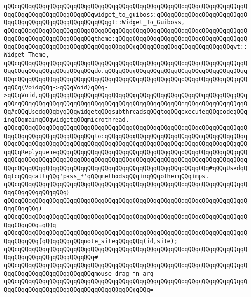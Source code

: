 \verb|qQQqqQQqqQQqqQQqqQQqqQQqqQQqqQQqqQQqqQQqqQQqqQQqqQQqqQQqqQQqqQQqqQQqqQQqqQQqqQQqqQQqqQQqqQQqqQQqwidget_to_guiboss:qQQqqQQqqQQqqQQqqQQqqQQqqQQqqQQqqQQqqQQqqQQqqQQqqQQqqQQqgt::Widget_To_Guiboss,|\newline
\verb|qQQqqQQqqQQqqQQqqQQqqQQqqQQqqQQqqQQqqQQqqQQqqQQqqQQqqQQqqQQqqQQqqQQqqQQqqQQqqQQqqQQqqQQqqQQqqQQqtheme:qQQqqQQqqQQqqQQqqQQqqQQqqQQqqQQqqQQqqQQqqQQqqQQqqQQqqQQqqQQqqQQqqQQqqQQqqQQqqQQqqQQqqQQqqQQqqQQqqQQqqQQqwt::Widget_Theme,|\newline
\verb|qQQqqQQqqQQqqQQqqQQqqQQqqQQqqQQqqQQqqQQqqQQqqQQqqQQqqQQqqQQqqQQqqQQqqQQqqQQqqQQqqQQqqQQqqQQqqQQqdo:qQQqqQQqqQQqqQQqqQQqqQQqqQQqqQQqqQQqqQQqqQQqqQQqqQQqqQQqqQQqqQQqqQQqqQQqqQQqqQQqqQQqqQQqqQQqqQQqqQQqqQQqqQQqqQQqqQQq(VoidqQQq->qQQqVoid)qQQq->qQQqVoid,qQQqqQQqqQQqqQQqqQQqqQQqqQQqqQQqqQQqqQQqqQQqqQQqqQQqqQQqqQQqqQQqqQQqqQQqqQQqqQQqqQQqqQQqqQQqqQQqqQQqqQQqqQQqqQQqqQQqqQQqqQQqqQQqqQQq#qQQqUsedqQQqbyqQQqwidgetqQQqsubthreadsqQQqtoqQQqexecuteqQQqcodeqQQqinqQQqmainqQQqwidgetqQQqmicrothread.|\newline
\verb|qQQqqQQqqQQqqQQqqQQqqQQqqQQqqQQqqQQqqQQqqQQqqQQqqQQqqQQqqQQqqQQqqQQqqQQqqQQqqQQqqQQqqQQqqQQqqQQqto:qQQqqQQqqQQqqQQqqQQqqQQqqQQqqQQqqQQqqQQqqQQqqQQqqQQqqQQqqQQqqQQqqQQqqQQqqQQqqQQqqQQqqQQqqQQqqQQqqQQqqQQqqQQqqQQqqQQqReplyqueueqQQqqQQqqQQqqQQqqQQqqQQqqQQqqQQqqQQqqQQqqQQqqQQqqQQqqQQqqQQqqQQqqQQqqQQqqQQqqQQqqQQqqQQqqQQqqQQqqQQqqQQqqQQqqQQqqQQqqQQqqQQqqQQqqQQqqQQqqQQqqQQqqQQqqQQqqQQqqQQqqQQqqQQqqQQqqQQqqQQqqQQq#qQQqUsedqQQqtoqQQqcallqQQq'pass_*'qQQqmethodsqQQqinqQQqotherqQQqimps.|\newline
\verb|qQQqqQQqqQQqqQQqqQQqqQQqqQQqqQQqqQQqqQQqqQQqqQQqqQQqqQQqqQQqqQQqqQQqqQQqqQQqqQQqqQQqqQQq}|\newline
\verb|qQQqqQQqqQQqqQQqqQQqqQQqqQQqqQQqqQQqqQQqqQQqqQQqqQQqqQQqqQQqqQQqqQQqqQQqqQQqqQQq)|\newline
\verb|qQQqqQQqqQQqqQQqqQQqqQQqqQQqqQQqqQQqqQQqqQQqqQQqqQQqqQQqqQQqqQQqqQQqqQQqqQQqqQQq=qQQq|\newline
\verb|qQQqqQQqqQQqqQQqqQQqqQQqqQQqqQQqqQQqqQQqqQQqqQQqqQQqqQQqqQQqqQQqqQQqqQQqqQQqqQQq{qQQqqQQqqQQqnote_siteqQQqqQQq(id,site);|\newline
\verb|qQQqqQQqqQQqqQQqqQQqqQQqqQQqqQQqqQQqqQQqqQQqqQQqqQQqqQQqqQQqqQQqqQQqqQQqqQQqqQQqqQQqqQQqqQQqqQQq#|\newline
\verb|qQQqqQQqqQQqqQQqqQQqqQQqqQQqqQQqqQQqqQQqqQQqqQQqqQQqqQQqqQQqqQQqqQQqqQQqqQQqqQQqqQQqqQQqqQQqqQQqmouse_drag_fn_arg|\newline
\verb|qQQqqQQqqQQqqQQqqQQqqQQqqQQqqQQqqQQqqQQqqQQqqQQqqQQqqQQqqQQqqQQqqQQqqQQqqQQqqQQqqQQqqQQqqQQqqQQqqQQqqQQqqQQqqQQq=|\newline
